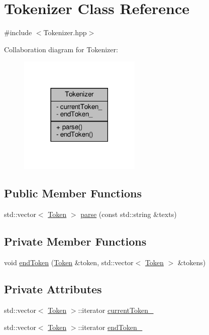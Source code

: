 \hypertarget{classft_1_1_tokenizer}{}\section{Tokenizer Class Reference}
\label{classft_1_1_tokenizer}


{\ttfamily \#include $<$Tokenizer.\+hpp$>$}



Collaboration diagram for Tokenizer\+:\nopagebreak
\begin{figure}[H]
\begin{center}
\leavevmode
\includegraphics[width=165pt]{classft_1_1_tokenizer__coll__graph}
\end{center}
\end{figure}
\subsection*{Public Member Functions}
\begin{DoxyCompactItemize}
\item 
std\+::vector$<$ \hyperlink{classft_1_1_token}{Token} $>$ \hyperlink{classft_1_1_tokenizer_a10bacfc70f3d74a0e04218c1df86f6c2}{parse} (const std\+::string \&texts)
\end{DoxyCompactItemize}
\subsection*{Private Member Functions}
\begin{DoxyCompactItemize}
\item 
void \hyperlink{classft_1_1_tokenizer_a4d9a98ce2e5ef728cfa5a68c8f726587}{end\+Token} (\hyperlink{classft_1_1_token}{Token} \&token, std\+::vector$<$ \hyperlink{classft_1_1_token}{Token} $>$ \&tokens)
\end{DoxyCompactItemize}
\subsection*{Private Attributes}
\begin{DoxyCompactItemize}
\item 
std\+::vector$<$ \hyperlink{classft_1_1_token}{Token} $>$\+::iterator \hyperlink{classft_1_1_tokenizer_a942c5b794d108f144c5b5028aaa34cb6}{current\+Token\+\_\+}
\item 
std\+::vector$<$ \hyperlink{classft_1_1_token}{Token} $>$\+::iterator \hyperlink{classft_1_1_tokenizer_a538ba3ab8ee1d0cef5cc3c999f3ab44c}{end\+Token\+\_\+}
\end{DoxyCompactItemize}


